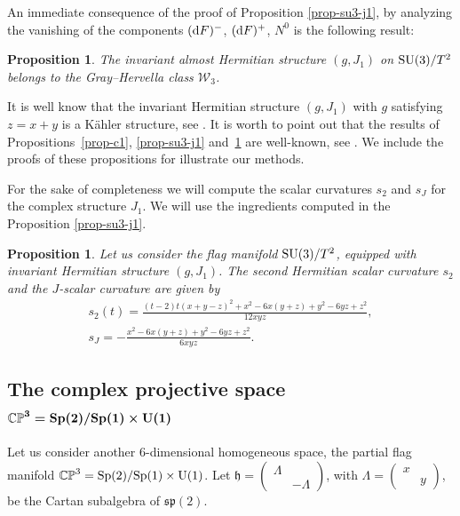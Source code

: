 \documentclass[pdftex]{sigma}%
\numberwithin{equation}{section}
\newtheorem{Proposition}[Theorem]{Proposition}
 { \theoremstyle{definition}
\newtheorem{Definition}[Theorem]{Definition}
\newtheorem{Question}[Theorem]{Question}
\newtheorem*{Notation}{Notation}
\newtheorem{Example}[Theorem]{Example}
\newtheorem{Remark}[Theorem]{Remark} }
\begin{document}
An immediate consequence of the proof of Proposition \ref{prop-su3-j1}, by analyzing the vanishing of the components $({\rm d}F)^{-}$, $({\rm d}F)^{+}$, $N^0$ is the following result:
\begin{Proposition}\label{prop-c3}
The invariant almost Hermitian structure $(g, J_{1})$ on ${\rm SU}(3)/T^2$ belongs to the Gray--Hervella class $\mathcal{W}_{3}$.%
\end{Proposition}
\begin{Remark}
It is well know that the invariant Hermitian structure $(g, J_{1})$ with $g$ satisfying $z=x+y$ is a K\"ahler structure, see \cite{wolf-gray}. It is worth to point out that the results of Propositions~\ref{prop-c1}, \ref{prop-su3-j1} and~\ref{prop-c3} are well-known, see \cite{fu2018twistor}. We include the proofs of these propositions for illustrate our methods.
\end{Remark}

For the sake of completeness we will compute the scalar curvatures $s_2$ and $s_J$ for the complex structure $J_1$. We will use the ingredients computed in the Proposition \ref{prop-su3-j1}.

\begin{Proposition}
Let us consider the flag manifold ${\rm SU}(3)/T^2$, equipped with invariant Hermitian structure $(g, J_{1})$. The second Hermitian scalar curvature $s_2$ and the $J$-scalar curvature are given by
\begin{gather*}
s_{2}(t)=\frac{(t-2) t (x+y-z)^2+x^2-6 x (y+z)+y^2-6 y z+z^2}{12 x y z},
\\
s_{J}=-\frac{x^2-6 x (y+z)+y^2-6 y z+z^2}{6 x y z}.
\end{gather*}
\end{Proposition}


\subsection[The complex projective space \protect{CP\textasciicircum{}{3}=Sp(2)/Sp(1) times U(1)}]
{The complex projective space $\boldsymbol{\mathbb{CP}^{3}={\rm Sp}(2)/{\rm Sp}(1)\times {\rm U}(1)}$}

Let us consider another 6-dimensional homogeneous space, the partial flag manifold $\mathbb{CP}^{3}={\rm Sp}(2)/{\rm Sp}(1)\times {\rm U}(1)$.
Let $\mathfrak{h}=\left(\begin{smallmatrix}
\Lambda&\\
&-\Lambda
\end{smallmatrix}\right)$, with $\Lambda=\left(\begin{smallmatrix}
x&\\
&y
\end{smallmatrix}\right)$, be the Cartan subalgebra of $\mathfrak{sp}(2)$.
\end{document}
